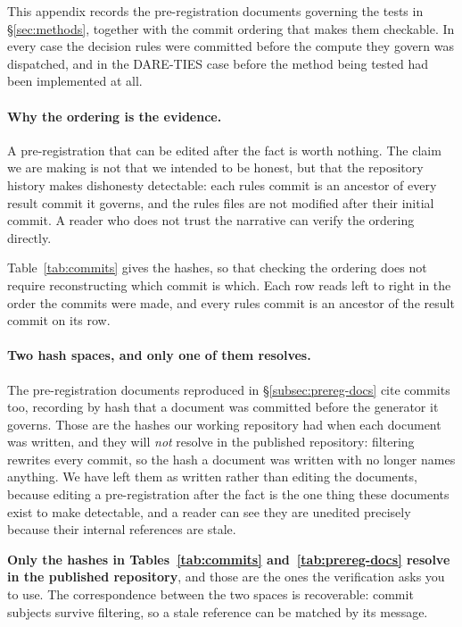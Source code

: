 This appendix records the pre-registration documents governing the tests
in \S\ref{sec:methods}, together with the commit ordering that makes them
checkable. In every case the decision rules were committed before the
compute they govern was dispatched, and in the DARE-TIES case before the
method being tested had been implemented at all.

\paragraph{Why the ordering is the evidence.} A pre-registration that can
be edited after the fact is worth nothing. The claim we are making is not
that we intended to be honest, but that the repository history makes
dishonesty detectable: each rules commit is an ancestor of every result
commit it governs, and the rules files are not modified after their
initial commit. A reader who does not trust the narrative can verify the
ordering directly.

Table~\ref{tab:commits} gives the hashes, so that checking the ordering does
not require reconstructing which commit is which. Each row reads left to
right in the order the commits were made, and every rules commit is an
ancestor of the result commit on its row.

\paragraph{Two hash spaces, and only one of them resolves.} The
pre-registration documents reproduced in \S\ref{subsec:prereg-docs} cite
commits too, recording by hash that a document was committed before the
generator it governs. Those are the hashes our working repository had when
each document was written, and they will \emph{not} resolve in the published
repository: filtering rewrites every commit, so the hash a document was
written with no longer names anything. We have left them as written rather
than editing the documents, because editing a pre-registration after the fact
is the one thing these documents exist to make detectable, and a reader can
see they are unedited precisely because their internal references are stale.

\textbf{Only the hashes in Tables~\ref{tab:commits} and~\ref{tab:prereg-docs}
resolve in the published repository}, and those are the ones the verification
asks you to use. The correspondence between the two spaces is recoverable:
commit subjects survive filtering, so a stale reference can be matched by its
message.

